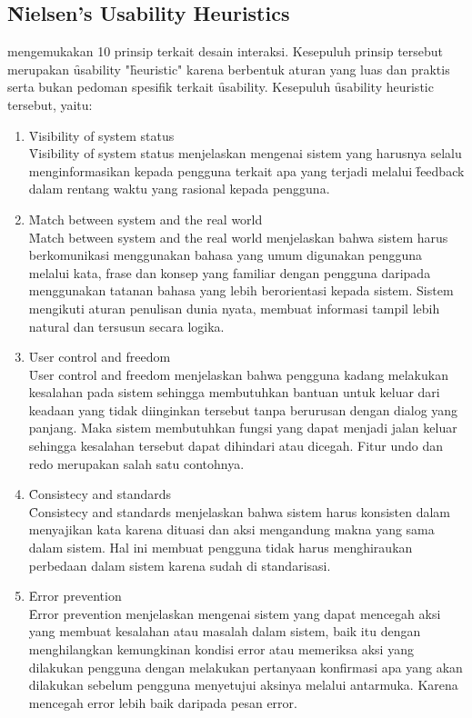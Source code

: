 \subsection{\f{Nielsen's Usability Heuristics}}\label{subsec:nush}
\citet{article.nielsen} mengemukakan 10 prinsip terkait desain interaksi. Kesepuluh prinsip tersebut merupakan \f{usability} "\f{heuristic}" karena berbentuk aturan yang luas dan praktis serta bukan pedoman spesifik terkait \f{usability}. Kesepuluh \f{usability} heuristic tersebut, yaitu:
\begin{enumerate}
	\item \f{Visibility of system status}\\
	\f{Visibility of system status} menjelaskan mengenai sistem yang harusnya selalu menginformasikan kepada pengguna terkait apa yang terjadi melalui \f{feedback} dalam rentang waktu yang rasional kepada pengguna.
	\item \f{Match between system and the real world}\\
	\f{Match between system and the real world} menjelaskan bahwa sistem harus berkomunikasi menggunakan bahasa yang umum digunakan pengguna melalui kata, frase dan konsep yang familiar dengan pengguna daripada menggunakan tatanan bahasa yang lebih berorientasi kepada sistem. Sistem mengikuti aturan penulisan dunia nyata, membuat informasi tampil lebih natural dan tersusun secara logika.
	\item \f{User control and freedom}\\
	\f{User control and freedom} menjelaskan bahwa pengguna kadang melakukan kesalahan pada sistem sehingga membutuhkan bantuan untuk keluar dari keadaan yang tidak diinginkan tersebut tanpa berurusan dengan dialog yang panjang. Maka sistem membutuhkan fungsi yang dapat menjadi jalan keluar sehingga kesalahan tersebut dapat dihindari atau dicegah. Fitur undo dan redo merupakan salah satu contohnya.
	\item \f{Consistecy and standards}\\
	\f{Consistecy and standards} menjelaskan bahwa sistem harus konsisten dalam menyajikan kata karena dituasi dan aksi mengandung makna yang sama dalam sistem. Hal ini membuat pengguna tidak harus menghiraukan perbedaan dalam sistem karena sudah di standarisasi.
	\item \f{Error prevention}\\
	\f{Error prevention} menjelaskan mengenai sistem yang dapat mencegah aksi yang membuat kesalahan atau masalah dalam sistem, baik itu dengan menghilangkan kemungkinan kondisi error atau memeriksa aksi yang dilakukan pengguna dengan melakukan pertanyaan konfirmasi apa yang akan dilakukan sebelum pengguna menyetujui aksinya melalui antarmuka. Karena mencegah error lebih baik daripada pesan error.

\end{enumerate}
